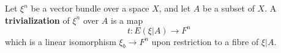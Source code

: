 Let $\xi^n$ be a vector bundle over a space $X$, and let $A$ be a subset of $X$. A \textbf{trivialization} of $\xi^n$ over $A$ is a map
$$t: E(\xi|A) \rightarrow F^n$$
which is a linear isomorphism $\xi_b \rightarrow F^n$ upon restriction to a fibre of $\xi|A$.
